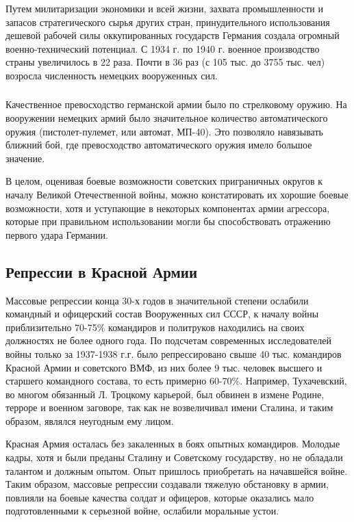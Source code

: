 \documentclass[12pt]{article}
\newcommand{\orange}[1]{{\color{orange}{#1}}}
\begin{document}
  \subsubsection*{\orange{Что же противопоставила фашистская Германия Вооруженным Силам СССР?}}
  Путем милитаризации экономики и всей жизни, захвата промышленности и запасов стратегического сырья других стран,
  принудительного использования дешевой рабочей силы оккупированных государств Германия создала огромный военно-технический потенциал.
  С 1934 г. по 1940 г. военное производство страны увеличилось в 22 раза.
  Почти в 36 раз (с 105 тыс. до 3755 тыс. чел) возросла численность немецких вооруженных сил.

  \subsubsection*{\orange{Подытожим:}}
  Качественное превосходство германской армии было по стрелковому оружию.
  На вооружении немецких армий было значительное количество автоматического оружия (пистолет-пулемет, или автомат, МП-40).
  Это позволяло навязывать ближний бой, где превосходство автоматического оружия имело большое значение.

  В целом, оценивая боевые возможности советских приграничных округов к началу Великой Отечественной войны,
  можно констатировать их хорошие боевые возможности, хотя и уступающие в некоторых компонентах армии агрессора,
  которые при правильном использовании могли бы способствовать отражению первого удара Германии.

  \subsection{Репрессии в Красной Армии}
  Массовые репрессии конца 30-х годов в значительной степени ослабили командный и офицерский состав Вооруженных сил СССР,
  к началу войны приблизительно 70-75\% командиров и политруков находились на своих должностях не более одного года.
  По подсчетам современных исследователей войны только за 1937-1938 г.г. было репрессировано свыше 40 тыс. командиров Красной Армии
  и советского ВМФ, из них более 9 тыс. человек высшего и старшего командного состава, то есть примерно 60-70\%.
  Например, Тухачевский, во многом обязанный Л. Троцкому карьерой, был обвинен в измене Родине, терроре и военном заговоре,
  так как не возвеличивал имени Сталина, и таким образом, являлся неугодным ему лицом.

  Красная Армия осталась без закаленных в боях опытных командиров.
  Молодые кадры, хотя и были преданы Сталину и Советскому государству, но не обладали талантом и должным опытом.
  Опыт пришлось приобретать на начавшейся войне.
  Таким образом, массовые репрессии создавали тяжелую обстановку в армии, повлияли на боевые качества солдат и офицеров,
  которые оказались мало подготовленными к серьезной войне, ослабили моральные устои.
\end{document}
